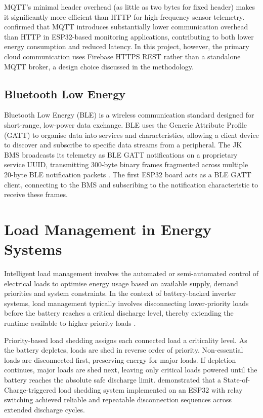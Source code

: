 \documentclass[12pt, a4paper]{report}
\begin{document}
MQTT's minimal header overhead (as little as two bytes for fixed header)
makes it significantly more efficient than HTTP for high-frequency sensor
telemetry. \citet{dzahir2023} confirmed that MQTT introduces substantially
lower communication overhead than HTTP in ESP32-based monitoring
applications, contributing to both lower energy consumption and reduced
latency. In this project, however, the primary cloud communication uses
Firebase HTTPS REST rather than a standalone MQTT broker, a design choice
discussed in the methodology.

\subsection{Bluetooth Low Energy}

Bluetooth Low Energy (BLE) is a wireless communication standard designed
for short-range, low-power data exchange. BLE uses the Generic Attribute
Profile (GATT) to organise data into services and characteristics,
allowing a client device to discover and subscribe to specific data streams
from a peripheral. The JK BMS broadcasts its telemetry as BLE GATT
notifications on a proprietary service UUID, transmitting 300-byte binary
frames fragmented across multiple 20-byte BLE notification packets
\citep{ijcrt2025}. The first ESP32 board acts as a BLE GATT client,
connecting to the BMS and subscribing to the notification characteristic
to receive these frames.

\section{Load Management in Energy Systems}

Intelligent load management involves the automated or semi-automated
control of electrical loads to optimise energy usage based on available
supply, demand priorities and system constraints. In the context of
battery-backed inverter systems, load management typically involves
disconnecting lower-priority loads before the battery reaches a critical
discharge level, thereby extending the runtime available to higher-priority
loads \citep{divya2009}.

Priority-based load shedding assigns each connected load a criticality
level. As the battery depletes, loads are shed in reverse order of
priority. Non-essential loads are disconnected first, preserving energy
for major loads. If depletion continues, major loads are shed next,
leaving only critical loads powered until the battery reaches the absolute
safe discharge limit. \citet{ijpeds2023} demonstrated that a
State-of-Charge-triggered load shedding system implemented on an ESP32
with relay switching achieved reliable and repeatable disconnection
sequences across extended discharge cycles.
\end{document}
